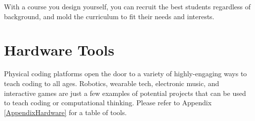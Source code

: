 With a course you design yourself, you can recruit the best students regardless of background, and mold the curriculum to fit their needs and interests.

\section{Hardware Tools}
Physical coding platforms open the door to a variety of highly-engaging ways to teach coding to all ages. Robotics, wearable tech, electronic music, and interactive games are just a few examples of potential projects that can be used to teach coding or computational thinking. Please refer to Appendix \ref{AppendixHardware} for a table of tools.